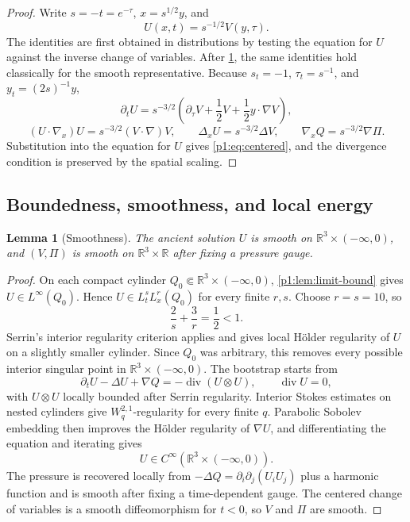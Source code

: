 \documentclass[11pt]{amsart}
\theoremstyle{plain}
\newtheorem{lemma}[lemma]{Lemma}
\theoremstyle{definition}
\theoremstyle{remark}
\numberwithin{equation}{section}
\newcommand{\R}{\mathbb R}
\newcommand{\divergence}{\operatorname{div}}
\begin{document}
\begin{proof}
Write \(s=-t=e^{-\tau}\), \(x=s^{1/2}y\), and
\[
   U(x,t)=s^{-1/2}V(y,\tau).
\]
The identities are first obtained in distributions by testing the equation
for \(U\) against the inverse change of variables.  After
\cref{p1:lem:smoothness}, the same identities hold classically for the smooth
representative.  Because \(s_t=-1\),
\(\tau_t=s^{-1}\), and \(y_t=(2s)^{-1}y\),
\[
   \partial_tU
   =
   s^{-3/2}\left(\partial_\tau V+\frac12V+\frac12y\cdot\nabla V\right),
\]
\[
   (U\cdot\nabla_x)U=s^{-3/2}(V\cdot\nabla)V,\qquad
   \Delta_xU=s^{-3/2}\Delta V,\qquad
   \nabla_xQ=s^{-3/2}\nabla\Pi.
\]
Substitution into the equation for \(U\) gives \eqref{p1:eq:centered}, and the
divergence condition is preserved by the spatial scaling.
\end{proof}

\subsection{Boundedness, smoothness, and local energy}

\begin{lemma}[Smoothness]\label{p1:lem:smoothness}
The ancient solution \(U\) is smooth on \(\R^3\times(-\infty,0)\), and
\((V,\Pi)\) is smooth on \(\R^3\times\R\) after fixing a pressure gauge.
\end{lemma}

\begin{proof}
On each compact cylinder \(Q_0\Subset\R^3\times(-\infty,0)\),
\cref{p1:lem:limit-bound} gives \(U\in L^\infty(Q_0)\).  Hence
\(U\in L^s_tL^r_x(Q_0)\) for every finite \(r,s\).  Choose \(r=s=10\), so
\[
   \frac2s+\frac3r=\frac12<1.
\]
Serrin's interior regularity criterion \cite{Serrin1962,Sohr2001} applies and
gives local H\"older regularity of \(U\) on a slightly smaller cylinder.
Since \(Q_0\) was arbitrary, this removes every possible interior singular
point in \(\R^3\times(-\infty,0)\).  The bootstrap starts from
\[
   \partial_tU-\Delta U+\nabla Q=-\divergence(U\otimes U),\qquad
   \divergence U=0,
\]
with \(U\otimes U\) locally bounded after Serrin regularity.  Interior Stokes
estimates on nested cylinders give \(W^{2,1}_q\)-regularity for every finite
\(q\).  Parabolic Sobolev embedding then improves the H\"older regularity of
\(\nabla U\), and differentiating the equation and iterating gives
\[
   U\in C^\infty(\R^3\times(-\infty,0)).
\]
The pressure is recovered locally from
\(-\Delta Q=\partial_i\partial_j(U_iU_j)\) plus a harmonic function and is
smooth after fixing a time-dependent gauge.  The centered change of variables
is a smooth diffeomorphism for \(t<0\), so \(V\) and \(\Pi\) are smooth.
\end{proof}
\end{document}
